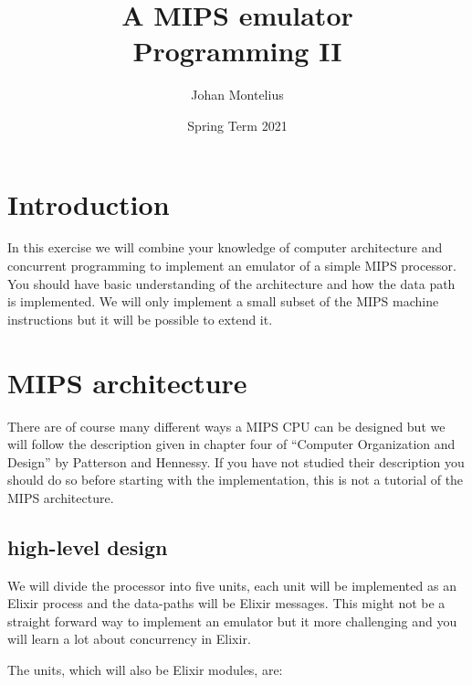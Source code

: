 \documentclass[a4paper,11pt]{article}
\begin{document}
\title{
    \textbf{A MIPS emulator}\\
    \large{Programming II}
}
\author{Johan Montelius}
\date{Spring Term 2021}
\maketitle
{}

\section{Introduction}

In this exercise we will combine your knowledge of computer
architecture and concurrent programming to implement an emulator of a
simple MIPS processor. You should have basic understanding of the
architecture and how the data path is implemented. We will only
implement a small subset of the MIPS machine instructions but it will
be possible to extend it.

\section{MIPS architecture}

There are of course many different ways a MIPS CPU can be designed but
we will follow the description given in chapter four of ``Computer
Organization and Design'' by Patterson and Hennessy. If you have not
studied their description you should do so before starting with the
implementation, this is not a tutorial of the MIPS architecture.


\subsection{high-level design}

We will divide the processor into five units, each unit will be
implemented as an Elixir process and the data-paths will be Elixir
messages. This might not be a straight forward way to implement an
emulator but it more challenging and you will learn a lot about
concurrency in Elixir.

The units, which will also be Elixir modules, are:
\end{document}

